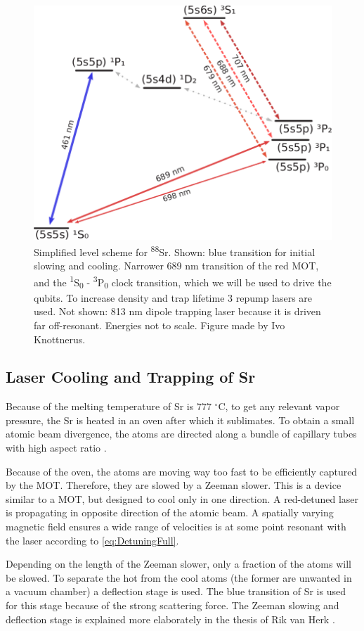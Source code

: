 \begin{figure}
	\centering
	\includegraphics[width=0.55\linewidth]{figures/SrLevel.pdf}
	\caption{Simplified level scheme for \textsuperscript{88}Sr. Shown: blue transition for initial slowing and cooling. Narrower 689 nm transition of the red \ac{MOT}, and the \textsuperscript{1}S\textsubscript{0} - \textsuperscript{3}P\textsubscript{0} clock transition, which we will be used to drive the qubits. To increase density and trap lifetime 3 repump lasers are used. Not shown: 813 nm dipole trapping laser because it is driven far off-resonant. Energies not to scale. Figure made by Ivo Knottnerus.}
	\label{fig:SrLevel}
\end{figure}

\subsection{Laser Cooling and Trapping of Sr}

Because of the melting temperature of Sr is $777$ ${}^{\circ}$C, to get any relevant vapor pressure, the Sr is heated in an oven after which it sublimates. To obtain a small atomic beam divergence, the atoms are directed along a bundle of capillary tubes with high aspect ratio \cite{Stellmer2013}. 

Because of the oven, the atoms are moving way too fast to be efficiently captured by the MOT. Therefore, they are slowed by a Zeeman slower. This is a device similar to a MOT, but designed to cool only in one direction. A red-detuned laser is propagating in opposite direction of the atomic beam. A spatially varying magnetic field ensures a wide range of velocities is at some point resonant with the laser according to \cref{eq:DetuningFull}. 

Depending on the length of the Zeeman slower, only a fraction of the atoms will be slowed. To separate the hot from the cool atoms (the former are unwanted in a vacuum chamber) a deflection stage is used. The blue transition of Sr is used for this stage because of the strong scattering force. The Zeeman slowing and deflection stage is explained more elaborately in the thesis of Rik van Herk \cite{Herk2022}.

